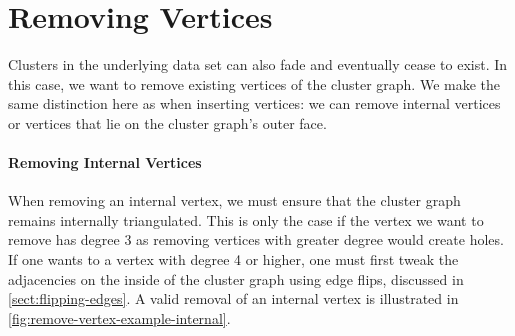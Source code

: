 \section{Removing Vertices}
\label{sect:removing-vertices}

Clusters in the underlying data set can also fade and eventually cease to exist. In this case, we want to remove existing vertices of the cluster graph. We make the same distinction here as when inserting vertices: we can remove internal vertices or vertices that lie on the cluster graph's outer face. 



\paragraph{Removing Internal Vertices}

When removing an internal vertex, we must ensure that the cluster graph remains internally triangulated. This is only the case if the vertex we want to remove has degree 3 as removing vertices with greater degree would create holes. If one wants to a vertex with degree 4 or higher, one must first tweak the adjacencies on the inside of the cluster graph using edge flips, discussed in \cref{sect:flipping-edges}. A valid removal of an internal vertex is illustrated in \cref{fig:remove-vertex-example-internal}.

